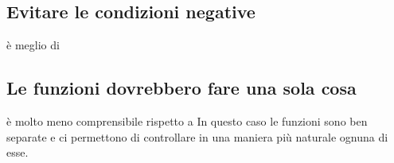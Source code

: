 \documentclass[11pt,a4paper]{book}
\begin{document}
\subsection{Evitare le condizioni negative}
\label{code: 071}
è meglio di
\label{code: 072}

\subsection{Le funzioni dovrebbero fare una sola cosa}
\label{code: 073}
è molto meno comprensibile rispetto a
\label{code: 074}
In questo caso le funzioni sono ben separate e ci permettono di controllare in una maniera più naturale ognuna di esse.
\end{document}
